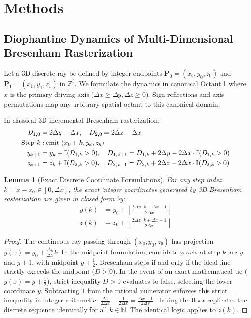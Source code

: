 \documentclass[11pt]{article}
\newtheorem{lemma}{Lemma}
\begin{document}
\section*{Methods}
\label{sec:methods}

\subsection*{Diophantine Dynamics of Multi-Dimensional Bresenham Rasterization}
Let a 3D discrete ray be defined by integer endpoints $\mathbf{P}_0 = (x_0, y_0, z_0)$ and $\mathbf{P}_1 = (x_1, y_1, z_1)$ in $\mathbb{Z}^3$. We formulate the dynamics in canonical Octant 1 where $x$ is the primary driving axis ($\Delta x \ge \Delta y, \Delta z \ge 0$). Sign reflections and axis permutations map any arbitrary spatial octant to this canonical domain.

In classical 3D incremental Bresenham rasterization:\cite{bresenham1965algorithm}
\begin{align}
    D_{1,0} &= 2\Delta y - \Delta x, \quad D_{2,0} = 2\Delta z - \Delta x \\
    \text{Step } k &: \text{emit } (x_0 + k, y_k, z_k) \notag \\
    y_{k+1} &= y_k + \mathbb{I}(D_{1,k} > 0), \quad D_{1,k+1} = D_{1,k} + 2\Delta y - 2\Delta x \cdot \mathbb{I}(D_{1,k} > 0) \notag \\
    z_{k+1} &= z_k + \mathbb{I}(D_{2,k} > 0), \quad D_{2,k+1} = D_{2,k} + 2\Delta z - 2\Delta x \cdot \mathbb{I}(D_{2,k} > 0) \notag
\end{align}

\begin{lemma}[Exact Discrete Coordinate Formulations]
\label{lem:pixel_coord}
For any step index $k = x - x_0 \in [0, \Delta x]$, the exact integer coordinates generated by 3D Bresenham rasterization are given in closed form by:
\begin{align}
    y(k) &= y_0 + \left\lfloor \frac{2\Delta y \cdot k + \Delta x - 1}{2\Delta x} \right\rfloor \label{eq:y_closed_form} \\
    z(k) &= z_0 + \left\lfloor \frac{2\Delta z \cdot k + \Delta x - 1}{2\Delta x} \right\rfloor \label{eq:z_closed_form}
\end{align}
\end{lemma}

\begin{proof}
The continuous ray passing through $(x_0, y_0, z_0)$ has projection $y(x) = y_0 + \frac{\Delta y}{\Delta x}k$. In the midpoint formulation, candidate voxels at step $k$ are $y$ and $y+1$, with midpoint $y + \frac{1}{2}$. Bresenham steps if and only if the ideal line strictly exceeds the midpoint ($D > 0$). In the event of an exact mathematical tie ($y(x) = y + \frac{1}{2}$), strict inequality $D > 0$ evaluates to false, selecting the lower coordinate $y$. Subtracting $1$ from the rational numerator enforces this strict inequality in integer arithmetic: $\frac{\Delta x}{2\Delta x} - \frac{1}{2\Delta x} = \frac{\Delta x - 1}{2\Delta x}$. Taking the floor replicates the discrete sequence identically for all $k \in \mathbb{N}$. The identical logic applies to $z(k)$.
\end{proof}
\end{document}
